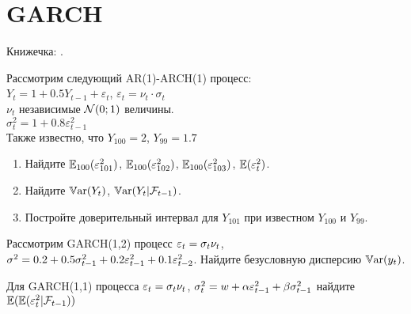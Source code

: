 

\chapter{GARCH}

Книжечка: \cite{francq2019garch}.



\begin{problem}
Рассмотрим следующий AR(1)-ARCH(1) процесс: \\
$Y_{t}=1+0.5Y_{t-1}+\varepsilon_{t}$, $\varepsilon_{t}=\nu_{t}\cdot \sigma_{t}$ \\
$\nu_{t}$ независимые $\mathcal{N}(0;1)$ величины. \\
$\sigma^{2}_{t}=1+0.8\varepsilon^{2}_{t-1}$\\
Также известно, что $Y_{100}=2$, $Y_{99}=1.7$
\begin{enumerate}
\item Найдите $\operatorname{\mathbb{E}}_{100}(\varepsilon^{2}_{101})$, $\operatorname{\mathbb{E}}_{100}(\varepsilon^{2}_{102})$, $\operatorname{\mathbb{E}}_{100}(\varepsilon^{2}_{103})$, $\operatorname{\mathbb{E}}(\varepsilon^{2}_{t})$.
\item Найдите $\operatorname{\mathbb{V}\mathrm{ar}}(Y_{t})$, $\operatorname{\mathbb{V}\mathrm{ar}}(Y_{t}|\mathcal{F}_{t-1})$.
\item Постройте доверительный интервал для $Y_{101}$ при известном $Y_{100}$ и $Y_{99}$.
\end{enumerate}
\begin{sol}
\end{sol}
\end{problem}




\begin{problem}
Рассмотрим GARCH(1,2) процесс $\varepsilon_t=\sigma_t \nu_t$, $\sigma^2=0.2+0.5\sigma^2_{t-1}+0.2\varepsilon_{t-1}^2+0.1\varepsilon_{t-2}^2$. 
Найдите безусловную дисперсию $\operatorname{\mathbb{V}\mathrm{ar}}(y_t)$.
\begin{sol}

\end{sol}
\end{problem}


\begin{problem}
Для GARCH(1,1) процесса $\varepsilon_t=\sigma_t \nu_t$, $\sigma^2_{t}= w + \alpha \varepsilon_{t-1}^2+ \beta \sigma^2_{t-1}$ найдите $\operatorname{\mathbb{E}}( \operatorname{\mathbb{E}}(\varepsilon_t^2 | \mathcal{F}_{t-1} ) )$
\begin{sol}

\end{sol}
\end{problem}



